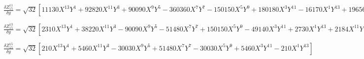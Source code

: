 \documentclass[10pt,landscape]{article}
\begin{document}
\vspace{1.2 mm}
\noindent $ \frac{\delta Z^{11}_{15}}{\delta y} = \sqrt{32} [11130X^{13}Y^{1} +92820X^{11}Y^{3} +90090X^{9}Y^{5} -360360X^{7}Y^{7} -150150X^{5}Y^{9} +180180X^{3}Y^{11} -16170X^{1}Y^{13} +19656X^{11}Y^{1} -200200X^{9}Y^{3} +144144X^{7}Y^{5} +432432X^{5}Y^{7} -280280X^{3}Y^{9} +24024X^{1}Y^{11} -8580X^{9}Y^{1} +102960X^{7}Y^{3} -216216X^{5}Y^{5} +102960X^{3}Y^{7} -8580X^{1}Y^{9}] $

\vspace{1.2 mm}
\noindent $ \frac{\delta Z^{13}_{15}}{\delta y} = \sqrt{32} [2310X^{13}Y^{1} +38220X^{11}Y^{3} -90090X^{9}Y^{5} -51480X^{7}Y^{7} +150150X^{5}Y^{9} -49140X^{3}Y^{11} +2730X^{1}Y^{13} +2184X^{11}Y^{1} -40040X^{9}Y^{3} +144144X^{7}Y^{5} -144144X^{5}Y^{7} +40040X^{3}Y^{9} -2184X^{1}Y^{11}] $

\vspace{1.2 mm}
\noindent $ \frac{\delta Z^{15}_{15}}{\delta y} = \sqrt{32} [210X^{13}Y^{1} +5460X^{11}Y^{3} -30030X^{9}Y^{5} +51480X^{7}Y^{7} -30030X^{5}Y^{9} +5460X^{3}Y^{11} -210X^{1}Y^{13}] $

\vspace{1.2 mm}
\clearpage
\end{document}
